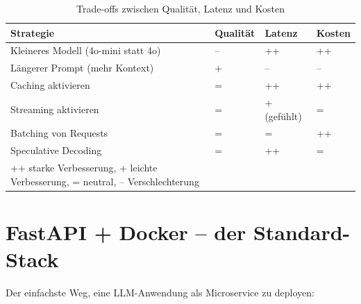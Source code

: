 \begin{table}[H]
\centering
\begin{tabularx}{\linewidth}{XXXX}
\toprule
\textbf{Strategie} & \textbf{Qualität} & \textbf{Latenz} & \textbf{Kosten} \\
\midrule
Kleineres Modell (4o-mini statt 4o) & -- & ++ & ++ \\
Längerer Prompt (mehr Kontext) & + & -- & -- \\
Caching aktivieren & = & ++ & ++ \\
Streaming aktivieren & = & + (gefühlt) & = \\
Batching von Requests & = & = & ++ \\
Speculative Decoding & = & ++ & = \\
\bottomrule
++ starke Verbesserung, + leichte Verbesserung, = neutral, -- Verschlechterung
\caption{Trade-offs zwischen Qualität, Latenz und Kosten}
\end{tabularx}
\end{table}

\section{FastAPI + Docker -- der Standard-Stack}

Der einfachste Weg, eine LLM-Anwendung als Microservice zu deployen:

